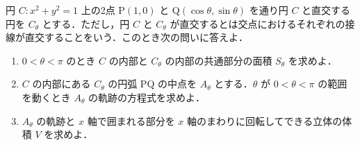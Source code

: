 \documentclass[../../main.tex]{subfiles}
\begin{document}
円 $C: x^2+y^2=1$ 上の2点 P$(1,0)$ と Q$(\cos\theta, \sin\theta)$ を通り円 $C$ と直交する円を $C_\theta$ とする．ただし，円 $C$ と $C_\theta$ が直交するとは交点におけるそれぞれの接線が直交することをいう．このとき次の問いに答えよ．

\begin{enumerate}
  \item $0 < \theta < \pi$ のとき $C$ の内部と $C_\theta$ の内部の共通部分の面積 $S_\theta$ を求めよ．
  \item $C$ の内部にある $C_\theta$ の円弧 PQ の中点を $A_\theta$ とする．$\theta$ が $0 < \theta < \pi$ の範囲を動くとき $A_\theta$ の軌跡の方程式を求めよ．
  \item $A_\theta$ の軌跡と $x$ 軸で囲まれる部分を $x$ 軸のまわりに回転してできる立体の体積 $V$ を求めよ．
\end{enumerate}
\end{document}
